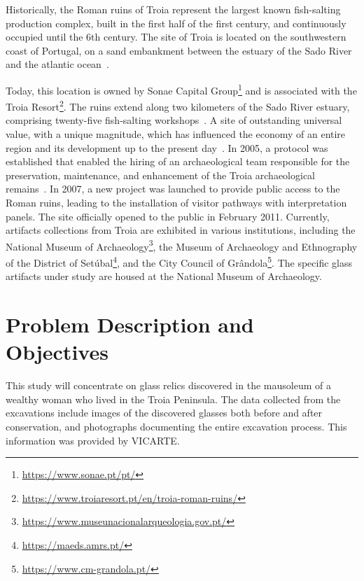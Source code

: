 Historically, the Roman ruins of Troia represent the largest known fish-salting production complex, built in the first half of the first century, and continuously occupied until the 6th century. 
The site of Troia is located on the southwestern coast of Portugal, on a sand embankment between the estuary of the Sado River and the atlantic ocean~\cite{pinto2018reassessment}.

Today, this location is owned by Sonae Capital Group\footnote{\url{https://www.sonae.pt/pt/}} and is associated with the Troia Resort\footnote{\url{https://www.troiaresort.pt/en/troia-roman-ruins/}}.
The ruins extend along two kilometers of the Sado River estuary, comprising twenty-five fish-salting workshops~\cite{hocquet2015fish}.
A site of outstanding  universal value, with a unique magnitude, which has influenced the economy of an entire region and its development up to the present day~\cite{unesco_troia}.
In 2005, a protocol was established that enabled the hiring of an archaeological team responsible for the preservation, maintenance, and enhancement of the Troia archaeological remains~\cite{pinto2014ruinas}. In 2007,
a new project was launched to provide public access to the Roman ruins, leading to the installation of visitor pathways with interpretation panels. The site officially opened to the public in February 2011. 
Currently, artifacts collections from Troia are exhibited in various institutions, including the National Museum of Archaeology\footnote{\url{https://www.museunacionalarqueologia.gov.pt/}}, the Museum of Archaeology and Ethnography of the District of Setúbal\footnote{\url{https://maeds.amrs.pt/}}, and the City Council of Grândola\footnote{\url{https://www.cm-grandola.pt/}}. The specific glass artifacts under study are housed at the National Museum of Archaeology.




\section{Problem Description and Objectives}
\label{sec:problem_description_and_objectives} 
This study will concentrate on glass relics discovered in the mausoleum of a wealthy woman who lived in the Troia Peninsula. The data collected from the excavations include 
images of the discovered glasses both before and after conservation, and photographs documenting the entire excavation process. 
This information was provided by \gls{VICARTE}.

